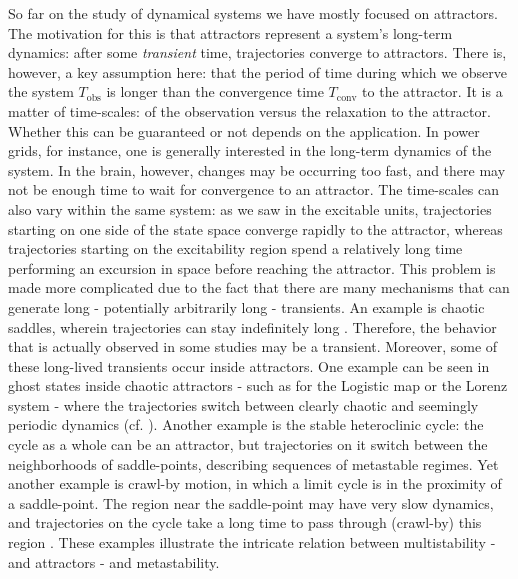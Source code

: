 So far on the study of dynamical systems we have mostly focused on attractors. The motivation for this is that attractors represent a system's long-term dynamics: after some \textit{transient} time, trajectories converge to attractors. There is, however, a key assumption here: that the period of time during which we observe the system $T_\mathrm{obs}$ is longer than the convergence time $T_\mathrm{conv}$ to the attractor. It is a matter of time-scales: of the observation versus the relaxation to the attractor. Whether this can be guaranteed or not depends on the application. In power grids, for instance, one is generally interested in the long-term dynamics of the system. In the brain, however, changes may be occurring too fast, and there may not be enough time to wait for convergence to an attractor. The time-scales can also vary within the same system: as we saw in the excitable units, trajectories starting on one side of the state space converge rapidly to the attractor, whereas trajectories starting on the excitability region spend a relatively long time performing an excursion in space before reaching the attractor. This problem is made more complicated due to the fact that there are many mechanisms that can generate long - potentially arbitrarily long - transients. An example is chaotic saddles, wherein trajectories can stay indefinitely long \cite{lai2009transient}. Therefore, the behavior that is actually observed in some studies may be a transient. 
Moreover, some of these long-lived transients occur inside attractors. One example can be seen in ghost states inside chaotic attractors - such as for the Logistic map or the Lorenz system - where the trajectories switch between clearly chaotic and seemingly periodic dynamics (cf. ). Another example is the stable heteroclinic cycle: the cycle as a whole can be an attractor, but trajectories on it switch between the neighborhoods of saddle-points, describing sequences of metastable regimes. Yet another example is crawl-by motion, in which a limit cycle is in the proximity of a saddle-point. The region near the saddle-point may have very slow dynamics, and trajectories on the cycle take a long time to pass through (crawl-by) this region \cite{hastings2018transient}. These examples illustrate the intricate relation between multistability - and attractors - and metastability. 

